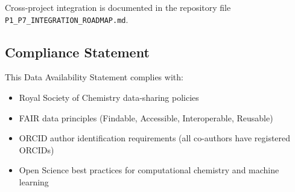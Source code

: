 \documentclass[11pt,a4paper]{article}
\begin{document}
\noindent Cross-project integration is documented in the repository file \texttt{P1\_P7\_INTEGRATION\_ROADMAP.md}.

\subsection*{Compliance Statement}

This Data Availability Statement complies with:

\begin{itemize}[leftmargin=*,itemsep=0.2em]
\item Royal Society of Chemistry data-sharing policies
\item FAIR data principles (Findable, Accessible, Interoperable, Reusable)
\item ORCID author identification requirements (all co-authors have registered ORCIDs)
\item Open Science best practices for computational chemistry and machine learning
\end{itemize}

\end{document}
